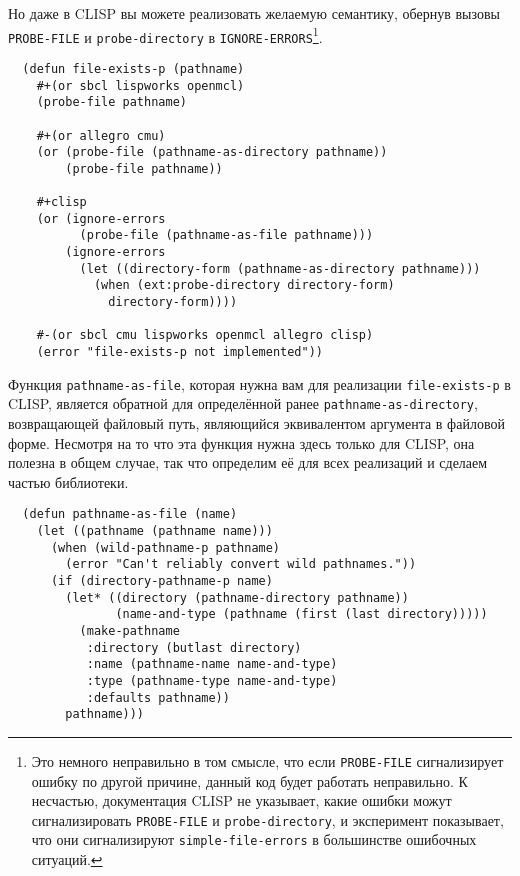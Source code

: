 Но даже в CLISP вы можете реализовать желаемую семантику, обернув вызовы \lstinline{PROBE-FILE}
и \lstinline{probe-directory} в \lstinline{IGNORE-ERRORS}\footnote{Это немного неправильно в том
  смысле, что если \lstinline{PROBE-FILE} сигнализирует ошибку по другой причине, данный код
  будет работать неправильно. К несчастью, документация CLISP не указывает, какие ошибки
  можут сигнализировать \lstinline{PROBE-FILE} и \lstinline{probe-directory}, и эксперимент
  показывает, что они сигнализируют \lstinline{simple-file-errors} в большинстве ошибочных
  ситуаций.}.

\begin{lstlisting}
  (defun file-exists-p (pathname)
    #+(or sbcl lispworks openmcl)
    (probe-file pathname)

    #+(or allegro cmu)
    (or (probe-file (pathname-as-directory pathname))
        (probe-file pathname))

    #+clisp
    (or (ignore-errors
          (probe-file (pathname-as-file pathname)))
        (ignore-errors
          (let ((directory-form (pathname-as-directory pathname)))
            (when (ext:probe-directory directory-form)
              directory-form))))

    #-(or sbcl cmu lispworks openmcl allegro clisp)
    (error "file-exists-p not implemented"))
\end{lstlisting}

Функция \lstinline{pathname-as-file}, которая нужна вам для реализации \lstinline{file-exists-p} в
CLISP, является обратной для определённой ранее \lstinline{pathname-as-directory}, возвращающей
файловый путь, являющийся эквивалентом аргумента в файловой форме. Несмотря на то что эта
функция нужна здесь только для CLISP, она полезна в общем случае, так что определим её для
всех реализаций и сделаем частью библиотеки.

\begin{lstlisting}
  (defun pathname-as-file (name)
    (let ((pathname (pathname name)))
      (when (wild-pathname-p pathname)
        (error "Can't reliably convert wild pathnames."))
      (if (directory-pathname-p name)
        (let* ((directory (pathname-directory pathname))
               (name-and-type (pathname (first (last directory)))))
          (make-pathname
           :directory (butlast directory)
           :name (pathname-name name-and-type)
           :type (pathname-type name-and-type)
           :defaults pathname))
        pathname)))
\end{lstlisting}


